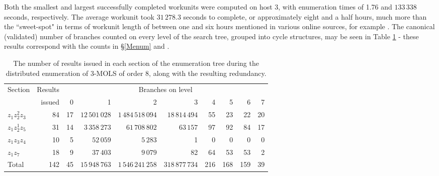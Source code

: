 Both the smallest and largest successfully completed workunits were computed on host 3, with enumeration times of 1.76 and $133\,338$ seconds, respectively. 
The average workunit took $31\,278.3$ seconds to complete, or approximately eight and a half hours, much more than the ``sweet-spot" in terms of workunit length of between one and six hours mentioned in various online sources, for example \cite{boincblog}. The canonical (validated) number of branches counted on every level of the search tree, grouped into cycle structures,  may be seen in  Table \ref{83naivebranches} - these results correspond with  the counts in \S\ref{Menum} and \cite[p. 114]{Kidd2012}.  
  \begin{table}[htb]
 \centering
 \caption{The number of results issued in each section of the enumeration tree during the distributed enumeration of 3-MOLS of order 8, along with the resulting redundancy.}
\begin{tabular}{lrrrrrrrrr}
\toprule
Section & Results  &  \multicolumn{8}{c}{Branches on level} \\
\cmidrule(lr){3-10}
 &issued &   0 & 1 & 2 & 3 & 4 & 5 & 6 & 7     \\ \midrule 
$z_1z_2^2z_3$ & 84  &17 & $12\,501\,028$ & $1\,484\,518\,094$ & $18\,814\,494$ & 55 & 23 & 22 & 20  \\ 
$z_1z_2^1z_5$ &31 &14 & $3\,358\,273$ & $61\,708\,802$ & $63\,157$ & 97 & 92 & 84 & 17   \\ 
$z_1z_3z_4$& 10 &5 & $52\,059$ & $5\,283$ & 1 & 0 & 0 & 0 & 0   \\ 
$z_1z_7$ & 18 &9 & $37\,403$ & $9\,079$ & 82 & 64 & 53 & 53 & 2   \\ \midrule
Total &142 &45 & $15\,948\,763$ & $1\,546\,241\,258$ & $318\,877\,734$ & 216 & 168 & 159 & 39  \\ \bottomrule
\end{tabular}\vspace*{.4cm}
\label{83naivebranches}
\end{table}

